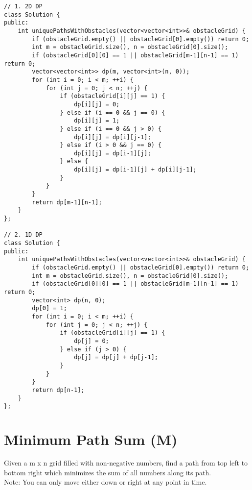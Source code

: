 \begin{lstlisting}
// 1. 2D DP
class Solution {
public:
    int uniquePathsWithObstacles(vector<vector<int>>& obstacleGrid) {
        if (obstacleGrid.empty() || obstacleGrid[0].empty()) return 0;
        int m = obstacleGrid.size(), n = obstacleGrid[0].size();
        if (obstacleGrid[0][0] == 1 || obstacleGrid[m-1][n-1] == 1) return 0;
        vector<vector<int>> dp(m, vector<int>(n, 0));
        for (int i = 0; i < m; ++i) {
            for (int j = 0; j < n; ++j) {
                if (obstacleGrid[i][j] == 1) {
                    dp[i][j] = 0;
                } else if (i == 0 && j == 0) {
                    dp[i][j] = 1;
                } else if (i == 0 && j > 0) {
                    dp[i][j] = dp[i][j-1];
                } else if (i > 0 && j == 0) {
                    dp[i][j] = dp[i-1][j];
                } else {
                    dp[i][j] = dp[i-1][j] + dp[i][j-1];
                }
            }
        }
        return dp[m-1][n-1];
    }
};

// 2. 1D DP
class Solution {
public:
    int uniquePathsWithObstacles(vector<vector<int>>& obstacleGrid) {
        if (obstacleGrid.empty() || obstacleGrid[0].empty()) return 0;
        int m = obstacleGrid.size(), n = obstacleGrid[0].size();
        if (obstacleGrid[0][0] == 1 || obstacleGrid[m-1][n-1] == 1) return 0;
        vector<int> dp(n, 0);
        dp[0] = 1;
        for (int i = 0; i < m; ++i) {
            for (int j = 0; j < n; ++j) {
                if (obstacleGrid[i][j] == 1) {
                    dp[j] = 0;
                } else if (j > 0) {
                    dp[j] = dp[j] + dp[j-1];
                }
            }
        }
        return dp[n-1];
    }
};
\end{lstlisting}


\section{Minimum Path Sum (M)}
Given a m x n grid filled with non-negative numbers, find a path from top left to bottom right which minimizes the sum of all numbers along its path.\\

Note: You can only move either down or right at any point in time.\\

